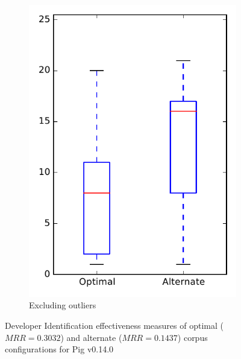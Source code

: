 \begin{figure}
\begin{subfigure}{.4\textwidth}
        \includegraphics[height=0.4\textheight]{figures/combo/dit_rq2_pig_no_outlier}
        \caption{Excluding outliers}\label{fig:combo:dit:rq2:pig_no_outlier}
    \end{subfigure}
\caption[Developer Identification effectiveness measures of optimal and alternate corpus configurations for Pig v0.14.0]%
{Developer Identification effectiveness measures of optimal ($MRR=0.3032$) and alternate ($MRR=0.1437$) corpus configurations for Pig v0.14.0}
\label{fig:combo:dit:rq2:pig}
\end{figure}
